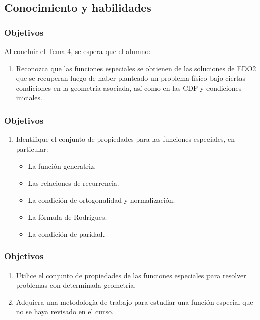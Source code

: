 \documentclass[12pt]{beamer}
\begin{document}
\subsection{Conocimiento y habilidades}

\begin{frame}
\frametitle{Objetivos}
Al concluir el Tema 4, se espera que el alumno:
\begin{enumerate}
\item Reconozca que las funciones especiales se obtienen de las soluciones de EDO2 que se recuperan luego de haber planteado un problema físico bajo ciertas condiciones en la geometría asociada, así como en las CDF y condiciones iniciales.                            
\seti
\end{enumerate}
\end{frame}
\begin{frame}
\frametitle{Objetivos}
\begin{enumerate}[<+->]
\conti
\item Identifique el conjunto de propiedades para las funciones especiales, en particular:
\begin{itemize}
\item[\ding{48}] La función generatriz.
\item[\ding{48}] Las relaciones de recurrencia.
\item[\ding{48}] La condición de ortogonalidad y normalización.
\item[\ding{48}] La fórmula de Rodrigues.
\item[\ding{48}] La condición de paridad.
\end{itemize}
\seti
\end{enumerate}
\end{frame}
\begin{frame}
\frametitle{Objetivos}
\begin{enumerate}[<+->]
\conti
\item Utilice el conjunto de propiedades de las funciones especiales para resolver problemas con determinada geometría.
\item Adquiera una metodología de trabajo para estudiar una función especial que no se haya revisado en el curso.
\end{enumerate}
\end{frame}
\end{document}
